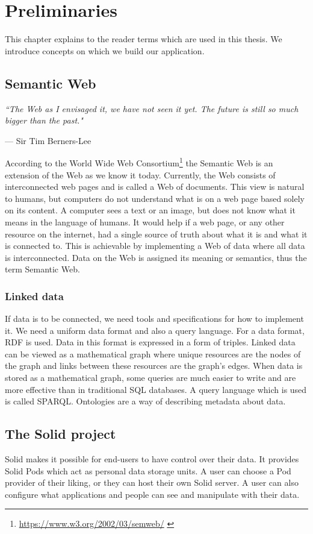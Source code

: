 \setlength{\epigraphwidth}{.5\textwidth}
\setlength\epigraphrule{0pt}

\chapter{Preliminaries}
This chapter explains to the reader terms which are used in this thesis.
We introduce concepts on which we build our application.

\section{Semantic Web}
\epigraph{\textit{``The Web as I envisaged it, we have not seen it yet. The future is still so much bigger than the past."}}{--- Sir Tim Berners-Lee}

According to the World Wide Web Consortium\footnote{\url{https://www.w3.org/2002/03/semweb/}  \label{fnlabel}} the Semantic Web is an extension of the Web as we know it today.
Currently, the Web consists of interconnected web pages and is called a Web of documents.
This view is natural to humans, but computers do not understand what is on a web page based solely on its content. 
A computer sees a text or an image, but does not know what it means in the language of humans.
It would help if a web page, or any other resource on the internet, had a single source of truth about what it is and what it is connected to.
This is achievable by implementing a Web of data where all data is interconnected.
Data on the Web is assigned its meaning or semantics, thus the term Semantic Web.

\subsection*{Linked data}
If data is to be connected, we need tools and specifications for how to implement it.
We need a uniform data format and also a query language.
For a data format, RDF is used.
Data in this format is expressed in a form of triples.
Linked data can be viewed as a mathematical graph where unique resources are the nodes of the graph and links between these resources are the graph's edges.
When data is stored as a mathematical graph, some queries are much easier to write and are more effective than in traditional SQL databases.
A query language which is used is called SPARQL.
Ontologies are a way of describing metadata about data.

\section{The Solid project}
Solid makes it possible for end-users to have control over their data.
It provides Solid Pods which act as personal data storage units.
A user can choose a Pod provider of their liking, or they can host their own Solid server.
A user can also configure what applications and people can see and manipulate with their data.
